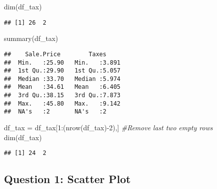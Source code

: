 \documentclass[
]{article}
\newenvironment{Shaded}{\begin{snugshade}}{\end{snugshade}}
\newcommand{\AttributeTok}[1]{\textcolor[rgb]{0.77,0.63,0.00}{#1}}
\newcommand{\CommentTok}[1]{\textcolor[rgb]{0.56,0.35,0.01}{\textit{#1}}}
\newcommand{\DecValTok}[1]{\textcolor[rgb]{0.00,0.00,0.81}{#1}}
\newcommand{\FunctionTok}[1]{\textcolor[rgb]{0.00,0.00,0.00}{#1}}
\newcommand{\NormalTok}[1]{#1}
\newcommand{\OtherTok}[1]{\textcolor[rgb]{0.56,0.35,0.01}{#1}}
\newcommand{\SpecialCharTok}[1]{\textcolor[rgb]{0.00,0.00,0.00}{#1}}
\newcommand{\StringTok}[1]{\textcolor[rgb]{0.31,0.60,0.02}{#1}}
\begin{document}
\begin{Shaded}
\begin{Highlighting}[]
\FunctionTok{dim}\NormalTok{(df\_tax)}
\end{Highlighting}
\end{Shaded}

\begin{verbatim}
## [1] 26  2
\end{verbatim}

\begin{Shaded}
\begin{Highlighting}[]
\FunctionTok{summary}\NormalTok{(df\_tax)}
\end{Highlighting}
\end{Shaded}

\begin{verbatim}
##    Sale.Price        Taxes      
##  Min.   :25.90   Min.   :3.891  
##  1st Qu.:29.90   1st Qu.:5.057  
##  Median :33.70   Median :5.974  
##  Mean   :34.61   Mean   :6.405  
##  3rd Qu.:38.15   3rd Qu.:7.873  
##  Max.   :45.80   Max.   :9.142  
##  NA's   :2       NA's   :2
\end{verbatim}

\begin{Shaded}
\begin{Highlighting}[]
\NormalTok{df\_tax }\OtherTok{=}\NormalTok{ df\_tax[}\DecValTok{1}\SpecialCharTok{:}\NormalTok{(}\FunctionTok{nrow}\NormalTok{(df\_tax)}\SpecialCharTok{{-}}\DecValTok{2}\NormalTok{),] }\CommentTok{\#Remove last two empty rows}
\FunctionTok{dim}\NormalTok{(df\_tax)}
\end{Highlighting}
\end{Shaded}

\begin{verbatim}
## [1] 24  2
\end{verbatim}

\hypertarget{question-1-scatter-plot}{%
\subsection{Question 1: Scatter Plot}\label{question-1-scatter-plot}}

\begin{Shaded}
\end{Shaded}
\end{document}
